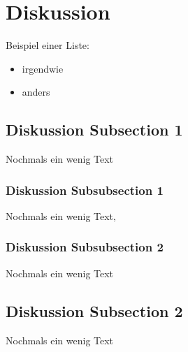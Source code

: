 
\section{Diskussion}

Beispiel einer Liste:

\begin{itemize} 
	\item irgendwie 
	\item anders
\end{itemize}


\subsection{Diskussion Subsection 1}
Nochmals ein wenig Text

\subsubsection{Diskussion Subsubsection 1}
Nochmals ein wenig Text‚

\subsubsection{Diskussion Subsubsection 2}
Nochmals ein wenig Text

\subsection{Diskussion Subsection 2}
Nochmals ein wenig Text
